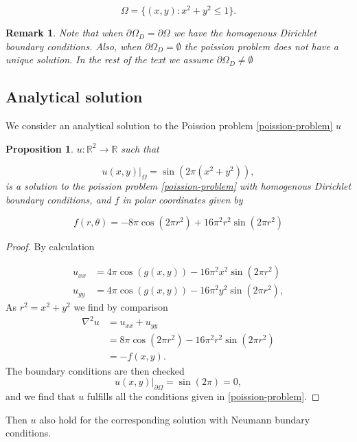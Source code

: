 \documentclass[11pt,a4paper,english]{elsarticle}%
\newcommand{\restr}[2]{\ensuremath{\left.#1\right|_{#2}}}
\newtheorem{proposition}[theorem]{Proposition}
\newtheorem*{remark}{Remark}
\begin{document}
\begin{equation*}
    \Omega = \{(x,y) : x^2+ y^2 \leq 1 \}.
\end{equation*}
\begin{remark}
Note that when $\partial \Omega_{D} = \partial \Omega$ we have the homogenous Dirichlet boundary conditions. Also, when $\partial \Omega_D = \emptyset$ the poission problem does not have a unique solution. In the rest of the text we assume $\partial \Omega_D \neq \emptyset$ 
\end{remark}



\subsection{Analytical solution}
We consider an analytical solution to the Poission problem \eqref{poission-problem} $u$
\begin{proposition}\label{prop-analytical-solution}
    $u: \mathbb{R}^2 \rightarrow \mathbb{R}$ such that

    \begin{equation}
    \restr{u(x,y)}{\Omega} = \sin(2\pi (x^2 + y^2)),
    \label{analytical-solution}
    \end{equation}
    is a solution to the poission problem \eqref{poission-problem} with homogenous Dirichlet boundary conditions, and  $f$ in polar coordinates given by

    \begin{equation}
    f(r,\theta) = -8\pi\cos(2\pi r^2) + 16 \pi^2r^2 \sin(2\pi r^2)
    \label{f-analytic}
    \end{equation}
\end{proposition}
\begin{proof}
By calculation

\begin{equation*}
\begin{aligned}
 u_{xx} &= 4\pi\cos(g(x,y)) - 16\pi^2x^2\sin(2\pi r^2)
\\
u_{yy} &= 4\pi\cos(g(x,y)) - 16\pi^2y^2\sin(2\pi r^2),
\end{aligned}
\end{equation*}
As $r^2 = x^2 + y^2$ we find by comparison
\begin{equation*}
\begin{aligned}
\nabla^2 u &= u_{xx} + u_{yy}\\
&= 8\pi \cos(2\pi r^2) - 16\pi^2r^2\sin(2\pi r^2)\\
& = -f(x,y).
\end{aligned}
\end{equation*}
The boundary conditions are then checked
\begin{equation*}
    \restr{u(x,y)}{\partial\Omega} = \sin(2\pi) = 0,
\end{equation*}
and we find that $u$ fulfills all the conditions given in \eqref{poission-problem}. 
\end{proof}
\noindent Then $u$ also hold for the corresponding solution with Neumann bundary conditions. 
\end{document}
